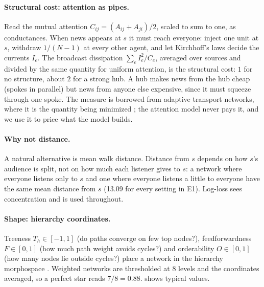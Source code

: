 \paragraph{Structural cost: attention as pipes.} Read the mutual attention $C_{ij}=(A_{ij}+A_{ji})/2$, scaled to sum to
one, as conductances. When news appears at $s$ it must reach everyone: inject one unit at $s$, withdraw $1/(N-1)$ at
every other agent, and let Kirchhoff's laws decide the currents $I_e$. The broadcast dissipation $\sum_e I_e^2/C_e$,
averaged over sources and divided by the same quantity for uniform attention, is the structural cost: $1$ for no
structure, about $2$ for a strong hub. A hub makes news from the hub cheap (spokes in parallel) but news from anyone else
expensive, since it must squeeze through one spoke. The measure is borrowed from adaptive transport networks, where it is
the quantity being minimized \citep{corson2010fluctuations}; the attention model never pays it, and we use it to price
what the model builds.


\paragraph{Why not distance.} A natural alternative is mean walk distance. Distance from $s$ depends on how
$s$'s audience is split, not on how much each listener gives to $s$: a network where everyone listens only to $s$ and one
where everyone listens a little to everyone have the same mean distance from $s$ (13.09 for every setting in E1). Log-loss sees
concentration and is used throughout.

\paragraph{Shape: hierarchy coordinates.} Treeness $T_h\in[-1,1]$ (do paths converge on few top nodes?),
feedforwardness $F\in[0,1]$ (how much path weight avoids cycles?) and orderability $O\in[0,1]$ (how many nodes lie
outside cycles?) place a network in the hierarchy morphospace \citep{corominas2013originsheirarchy}. Weighted networks
are thresholded at 8 levels and the coordinates averaged, so a perfect star reads $7/8=0.88$.  shows
typical values.

